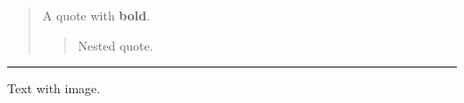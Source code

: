 \begin{quote}
A quote with \textbf{bold}.

\begin{quote}
Nested quote.
\end{quote}
\end{quote}

\medskip\hrule\medskip


Text with image.


